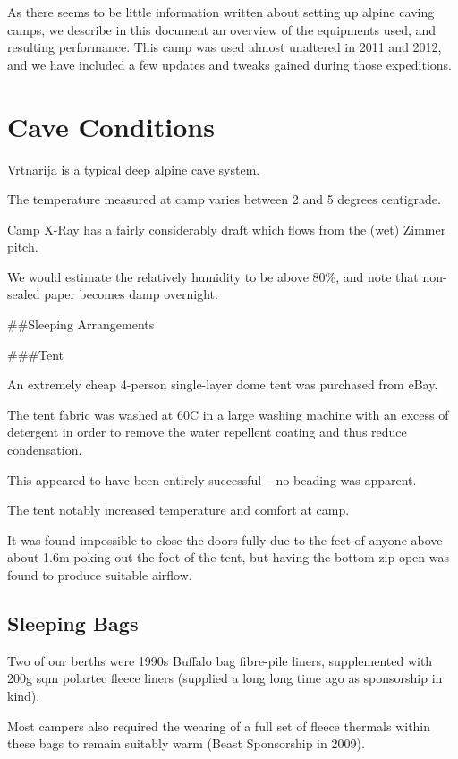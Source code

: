 As there seems to be little information written about setting up alpine
caving camps, we describe in this document an overview of the equipments
used, and resulting performance. This camp was used almost unaltered in
2011 and 2012, and we have included a few updates and tweaks gained
during those expeditions.

\hypertarget{cave-conditions}{%
\section{Cave Conditions}\label{cave-conditions}}

Vrtnarija is a typical deep alpine cave system.

The temperature measured at camp varies between 2 and 5 degrees
centigrade.

Camp X-Ray has a fairly considerably draft which flows from the (wet)
Zimmer pitch.

We would estimate the relatively humidity to be above 80\%, and note
that non-sealed paper becomes damp overnight.

\#\#Sleeping Arrangements

\#\#\#Tent

An extremely cheap 4-person single-layer dome tent was purchased from
eBay.

The tent fabric was washed at 60C in a large washing machine with an
excess of detergent in order to remove the water repellent coating and
thus reduce condensation.

This appeared to have been entirely successful -- no beading was
apparent.

The tent notably increased temperature and comfort at camp.

It was found impossible to close the doors fully due to the feet of
anyone above about 1.6m poking out the foot of the tent, but having the
bottom zip open was found to produce suitable airflow.

\hypertarget{sleeping-bags}{%
\subsection{Sleeping Bags}\label{sleeping-bags}}

Two of our berths were 1990s Buffalo bag fibre-pile liners, supplemented
with 200g sqm polartec fleece liners (supplied a long long time ago as
sponsorship in kind).

Most campers also required the wearing of a full set of fleece thermals
within these bags to remain suitably warm (Beast Sponsorship in 2009).

